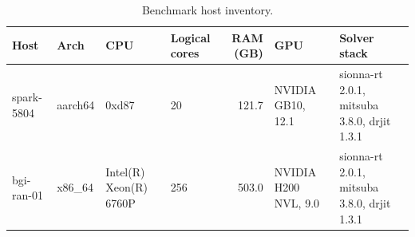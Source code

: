 \begin{table}[t]
  \centering
  \caption{Benchmark host inventory.}
  \label{tab:hosts}
  \begin{tabular}{llllrll}
    \toprule
    Host & Arch & CPU & Logical cores & RAM (GB) & GPU & Solver stack \\
    \midrule
    spark-5804 & aarch64 & 0xd87 & 20 & 121.7 & NVIDIA GB10, 12.1 & sionna-rt 2.0.1, mitsuba 3.8.0, drjit 1.3.1 \\
    bgi-ran-01 & x86\_64 & Intel(R) Xeon(R) 6760P & 256 & 503.0 & NVIDIA H200 NVL, 9.0 & sionna-rt 2.0.1, mitsuba 3.8.0, drjit 1.3.1 \\
    \bottomrule
  \end{tabular}
\end{table}
